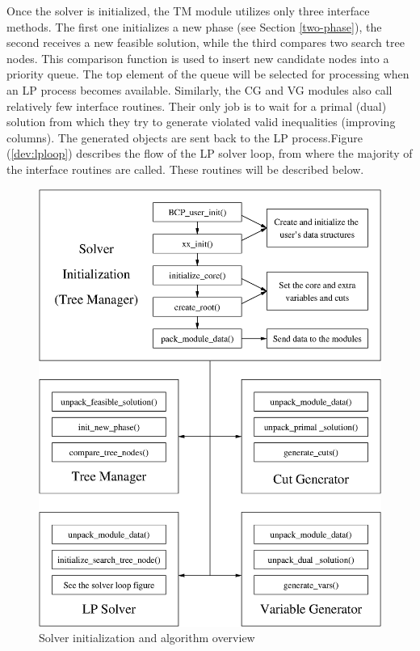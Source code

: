 Once the solver is initialized, the TM module utilizes only three
interface methods. The first one initializes a new phase (see Section
\ref{two-phase}), the second receives a new feasible solution, while
the third compares two search tree nodes. This comparison function is
used to insert new candidate nodes into a priority queue. The top
element of the queue will be selected for processing when an LP
process becomes available. Similarly, the CG and VG modules also call
relatively few interface routines. Their only job is to wait for a
primal (dual) solution from which they try to generate violated valid
inequalities (improving columns). The generated objects are sent back
to the LP process.Figure (\ref{dev:lploop}) describes the flow of
the LP solver loop, from where the majority of the interface routines
are called. These routines will be described below.

\begin{figure}
\begin{center}
\includegraphics[scale=0.75]{flow-init.eps}
\end{center}
\caption{\label{dev:initmodule} Solver initialization and algorithm overview}
\end{figure}

